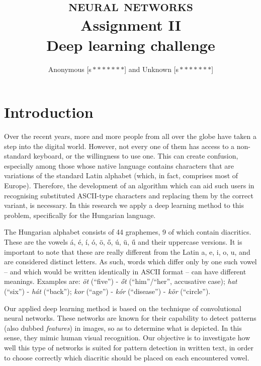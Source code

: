 \documentclass[11pt]{article}
\author{Anonymous [s\,$*******$] and Unknown [s\,$*******$]}
\title{\textsc{\Huge neural networks}\\Assignment II\\[6mm]\large\bf Deep learning challenge}
\begin{document}
\maketitle
\section{Introduction}
Over the recent years, more and more people from all over the globe have taken a step into the digital world. However, not every one of them has access to a non-standard keyboard, or the willingness to use one. This can create confusion, especially among those whose native language contains characters that are variations of the standard Latin alphabet (which, in fact, comprises most of Europe). Therefore, the development of an algorithm which can aid such users in recognising substituted ASCII-type characters and replacing them by the correct variant, is necessary. In this research we apply a deep learning method to this problem, specifically for the Hungarian language.\par
The Hungarian alphabet consists of 44 graphemes, 9 of which contain diacritics. These are the vowels á, é, í, ó, ö, ő, ú, ü, ű and their uppercase versions. It is important to note that these are really different from the Latin a, e, i, o, u, and are considered distinct letters. As such, words which differ only by one such vowel -- and which would be written identically in ASCII format -- can have different meanings. Examples are: \textit{öt} (``five'') - \textit{őt} (``him''/``her'', accusative case); \textit{hat} (``six'') - \textit{hát} (``back''); \textit{kor} (``age'') - \textit{kór} (``disease'') - \textit{kör} (``circle'').\par
Our applied deep learning method is based on the technique of convolutional neural networks. These networks are known for their capability to detect patterns (also dubbed \textit{features}) in images, so as to determine what is depicted. In this sense, they mimic human visual recognition. Our objective is to investigate how well this type of networks is suited for pattern detection in written text, in order to choose correctly which diacritic should be placed on each encountered vowel.
\end{document}
